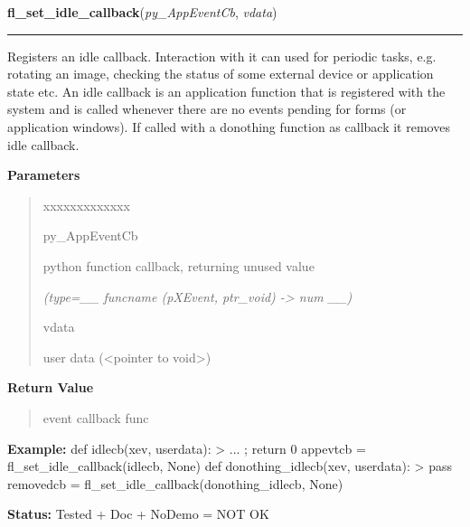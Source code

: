     \vspace{0.5ex}

\hspace{.8\funcindent}\begin{boxedminipage}{\funcwidth}

    \raggedright \textbf{fl\_set\_idle\_callback}(\textit{py\_AppEventCb}, \textit{vdata})

    \vspace{-1.5ex}

    \rule{\textwidth}{0.5\fboxrule}
\setlength{\parskip}{2ex}
    Registers an idle callback. Interaction with it  can used for periodic 
    tasks, e.g. rotating an image, checking the status of some external 
    device or application state etc. An idle callback is an application 
    function that is registered with the system and is called whenever 
    there are no events pending for forms (or application windows). If 
    called with a donothing function as callback it removes idle callback.

\setlength{\parskip}{1ex}
      \textbf{Parameters}
      \vspace{-1ex}

      \begin{quote}
        \begin{Ventry}{xxxxxxxxxxxxx}

          \item[py\_AppEventCb]

          python function callback, returning unused value

            {\it (type=\_\_ funcname (pXEvent, ptr\_void) -{\textgreater} num \_\_)}

          \item[vdata]

          user data ({\textless}pointer to void{\textgreater})

        \end{Ventry}

      \end{quote}

      \textbf{Return Value}
    \vspace{-1ex}

      \begin{quote}
      event callback func

      \end{quote}

\textbf{Example:} def idlecb(xev, userdata): {\textgreater} ... ; return 0 appevtcb = 
fl\_set\_idle\_callback(idlecb, None) def donothing\_idlecb(xev, userdata):
{\textgreater} pass removedcb = fl\_set\_idle\_callback(donothing\_idlecb, 
None)



\textbf{Status:} Tested + Doc + NoDemo = NOT OK



    \end{boxedminipage}

